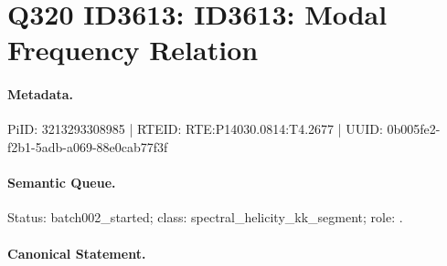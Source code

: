 \section*{Q320 ID3613: ID3613: Modal Frequency Relation}
\paragraph{Metadata.}
PiID: 3213293308985 | RTEID: RTE:P14030.0814:T4.2677 | UUID: 0b005fe2-f2b1-5adb-a069-88e0cab77f3f

\paragraph{Semantic Queue.}
Status: batch002\_started; class: spectral\_helicity\_kk\_segment; role: .

\paragraph{Canonical Statement.}
